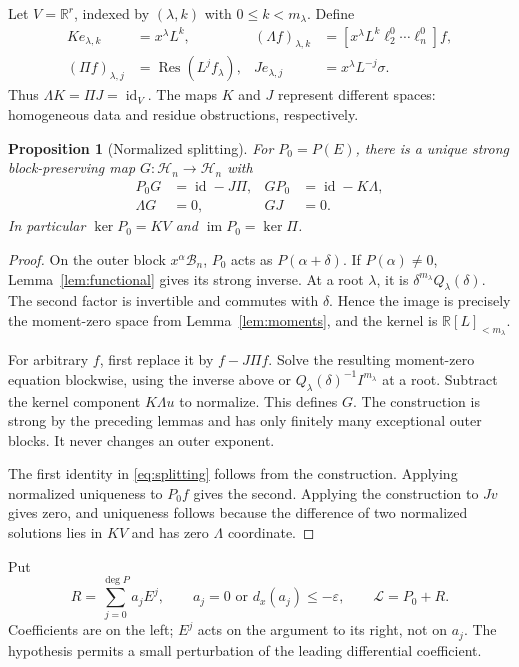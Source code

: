 \documentclass[11pt,a4paper]{article}
\numberwithin{equation}{section}
\newtheorem{proposition}[theorem]{Proposition}
\theoremstyle{definition}
\theoremstyle{remark}
\theoremstyle{definition}
\newcommand{\R}{\mathbb R}
\newcommand{\Hh}{\mathcal H}
\newcommand{\Bb}{\mathcal B}
\newcommand{\Ll}{\mathcal L}
\newcommand{\Res}{\operatorname{Res}}
\newcommand{\im}{\operatorname{im}}
\newcommand{\Id}{\operatorname{id}}
\newcommand{\dx}{d_x}
\newcommand{\eps}{\varepsilon}
\newcommand{\coef}[2]{[#1]#2}
\begin{document}
Let $V=\R^r$, indexed by $(\lambda,k)$ with $0\le k<m_\lambda$. Define
\begin{align}
 Ke_{\lambda,k}&=x^\lambda L^k,
 & (\Lambda f)_{\lambda,k}
 &=\coef{x^\lambda L^k\ell_2^0\cdots\ell_n^0}{f},\label{eq:KLambda}\\
 (\Pi f)_{\lambda,j}&=\Res(L^j f_\lambda),
 &Je_{\lambda,j}&=x^\lambda L^{-j}\sigma.
 \label{eq:PiJ}
\end{align}
Thus $\Lambda K=\Pi J=\Id_V$. The maps $K$ and $J$ represent different spaces: homogeneous data and residue obstructions, respectively.

\begin{proposition}[Normalized splitting]
\label{prop:split}
For $P_0=P(E)$, there is a unique strong block-preserving map $G:\Hh_n\to\Hh_n$ with
\begin{align}
 P_0G&=\Id-J\Pi,&GP_0&=\Id-K\Lambda,\label{eq:splitting}\\
 \Lambda G&=0,&GJ&=0.
 \label{eq:normalization}
\end{align}
In particular $\ker P_0=KV$ and $\im P_0=\ker\Pi$.
\end{proposition}
\begin{proof}
On the outer block $x^\alpha\Bb_n$, $P_0$ acts as $P(\alpha+\delta)$. If $P(\alpha)\ne0$, Lemma~\ref{lem:functional} gives its strong inverse. At a root $\lambda$, it is $\delta^{m_\lambda}Q_\lambda(\delta)$. The second factor is invertible and commutes with $\delta$. Hence the image is precisely the moment-zero space from Lemma~\ref{lem:moments}, and the kernel is $\R[L]_{<m_\lambda}$.

For arbitrary $f$, first replace it by $f-J\Pi f$. Solve the resulting moment-zero equation blockwise, using the inverse above or $Q_\lambda(\delta)^{-1}I^{m_\lambda}$ at a root. Subtract the kernel component $K\Lambda u$ to normalize. This defines $G$. The construction is strong by the preceding lemmas and has only finitely many exceptional outer blocks. It never changes an outer exponent.

The first identity in \eqref{eq:splitting} follows from the construction. Applying normalized uniqueness to $P_0f$ gives the second. Applying the construction to $Jv$ gives zero, and uniqueness follows because the difference of two normalized solutions lies in $KV$ and has zero $\Lambda$ coordinate.
\end{proof}

Put
\begin{equation}
 R=\sum_{j=0}^{\deg P}a_jE^j,
 \qquad a_j=0\text{ or }\dx(a_j)\le-\eps,
 \qquad\Ll=P_0+R.
 \label{eq:operator}
\end{equation}
Coefficients are on the left; $E^j$ acts on the argument to its right, not on $a_j$. The hypothesis permits a small perturbation of the leading differential coefficient.
\end{document}
